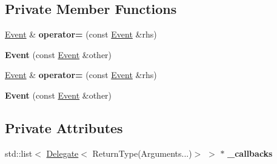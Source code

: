 \subsection*{Private Member Functions}
\begin{DoxyCompactItemize}
\item 
\hyperlink{class_ensum_1_1_utils_1_1_event}{Event} \& {\bfseries operator=} (const \hyperlink{class_ensum_1_1_utils_1_1_event}{Event} \&rhs)\hypertarget{class_ensum_1_1_utils_1_1_event_3_01_return_type_07_arguments_8_8_8_08_4_a8a2c73ebb55687bce62f712ab44b9824}{}\label{class_ensum_1_1_utils_1_1_event_3_01_return_type_07_arguments_8_8_8_08_4_a8a2c73ebb55687bce62f712ab44b9824}

\item 
{\bfseries Event} (const \hyperlink{class_ensum_1_1_utils_1_1_event}{Event} \&other)\hypertarget{class_ensum_1_1_utils_1_1_event_3_01_return_type_07_arguments_8_8_8_08_4_a9eb1b82ae773dec28eb4fc16890cc63e}{}\label{class_ensum_1_1_utils_1_1_event_3_01_return_type_07_arguments_8_8_8_08_4_a9eb1b82ae773dec28eb4fc16890cc63e}

\item 
\hyperlink{class_ensum_1_1_utils_1_1_event}{Event} \& {\bfseries operator=} (const \hyperlink{class_ensum_1_1_utils_1_1_event}{Event} \&rhs)\hypertarget{class_ensum_1_1_utils_1_1_event_3_01_return_type_07_arguments_8_8_8_08_4_a8a2c73ebb55687bce62f712ab44b9824}{}\label{class_ensum_1_1_utils_1_1_event_3_01_return_type_07_arguments_8_8_8_08_4_a8a2c73ebb55687bce62f712ab44b9824}

\item 
{\bfseries Event} (const \hyperlink{class_ensum_1_1_utils_1_1_event}{Event} \&other)\hypertarget{class_ensum_1_1_utils_1_1_event_3_01_return_type_07_arguments_8_8_8_08_4_a9eb1b82ae773dec28eb4fc16890cc63e}{}\label{class_ensum_1_1_utils_1_1_event_3_01_return_type_07_arguments_8_8_8_08_4_a9eb1b82ae773dec28eb4fc16890cc63e}

\end{DoxyCompactItemize}
\subsection*{Private Attributes}
\begin{DoxyCompactItemize}
\item 
std\+::list$<$ \hyperlink{class_ensum_1_1_utils_1_1_delegate}{Delegate}$<$ Return\+Type(Arguments...)$>$ $>$ $\ast$ {\bfseries \+\_\+callbacks}\hypertarget{class_ensum_1_1_utils_1_1_event_3_01_return_type_07_arguments_8_8_8_08_4_a275c35537653279e6f6ed062cefbec5b}{}\label{class_ensum_1_1_utils_1_1_event_3_01_return_type_07_arguments_8_8_8_08_4_a275c35537653279e6f6ed062cefbec5b}

\end{DoxyCompactItemize}


